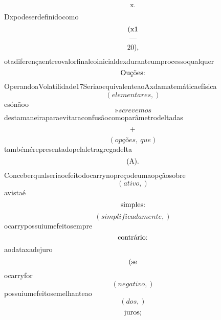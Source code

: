 \documentclass{article}
\begin{document}
\begin{equation}
$x.$
\end{equation}Dxpodeserdefinidocomo\begin{equation}
$(x1$
\end{equation}\begin{equation}
—
\end{equation}\begin{equation}
$20),$
\end{equation}otadiferençaentreovalorfinaleoinicialdexduranteumprocessoqualquer\begin{equation}
$Ouções:$
\end{equation}OperandoaVolatilidade17SeriaoequivalenteaoAxdamatemáticaefísica\begin{equation}
\left( elementares,\right)
\end{equation}esónãoo\begin{equation}
»screvemos
\end{equation}destamaneiraparaevitaraconfusãocomoparâmetrodeltadas\begin{equation}
$+$
\end{equation}\begin{equation}
\left( opções, \  que\right)
\end{equation}tambémérepresentadopelaletragregadelta\begin{equation}
$(A).$
\end{equation}Conceberqualseriaoefeitodocarrynopreçodeumaopçãosobre\begin{equation}
\left( ativo,\right)
\end{equation}avistaé\begin{equation}
$simples:$
\end{equation}\begin{equation}
\left( simplificadamente,\right)
\end{equation}ocarrypossuiumefeitosempre\begin{equation}
$contrário:$
\end{equation}aodataxadejuro\begin{equation}
$(se$
\end{equation}ocarryfor\begin{equation}
\left( negativo,\right)
\end{equation}possuiumefeitosemelhanteao\begin{equation}
\left( dos,\right)
\end{equation}\begin{equation}
$juros;$
\end{equation}\begin{equation}

\end{equation}
\end{document}
